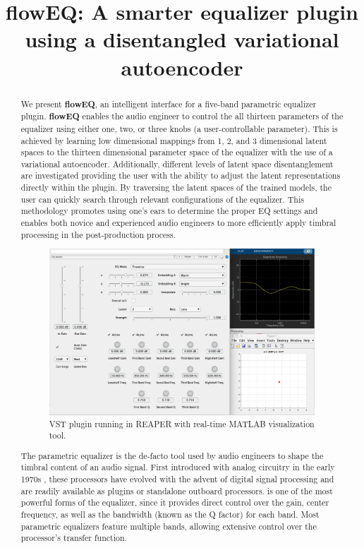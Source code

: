 \documentclass[a4paper]{article} %
\title{\MakeLowercase{flow}EQ: A smarter equalizer plugin using a disentangled variational autoencoder}
\begin{document}
\maketitle

\begin{abstract}


We present \textbf{flowEQ}, an intelligent interface for a five-band parametric equalizer plugin. \textbf{flowEQ} enables the audio engineer to control the all thirteen parameters of the equalizer using either one, two, or three knobs (a user-controllable parameter). This is achieved by learning low dimensional mappings from 1, 2, and 3 dimensional latent spaces to the thirteen dimensional parameter space of the equalizer with the use of a variational autoencoder. Additionally, different levels of latent space disentanglement are investigated providing the user with the ability to adjust the latent representations directly within the plugin. By traversing the latent spaces of the trained models, the user can quickly search through relevant configurations of the equalizer. This methodology promotes using one’s ears to determine the proper EQ settings and enables both novice and experienced audio engineers to more efficiently apply timbral processing in the post-production process.


\begin{figure}[H]
  \centerline{
  \includegraphics[width=0.6\columnwidth]{../../img/full_visual.png}}
  \caption{VST plugin running in REAPER with real-time MATLAB visualization tool.}
  \label{fig:plugin}
 \end{figure}


The parametric equalizer is the de-facto tool used by audio engineers to shape the timbral content of an audio signal. First introduced with analog circuitry in the early 1970s \cite{massenburg}, these processors have evolved with the advent of digital signal processing and are readily available as plugins or standalone outboard processors.  is one of the most powerful forms of the equalizer, since it provides direct control over the gain, center frequency, as well as the bandwidth (known as the Q factor) for each band. Most parametric equalizers feature multiple bands, allowing extensive control over the processor’s transfer function. 


\end{abstract}
\end{document}
